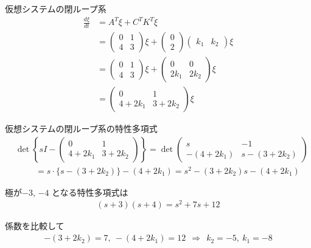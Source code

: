 仮想システムの閉ループ系
\begin{align*}
 \frac{d \xi}{dt} & = A^T \xi + C^T K^T \xi
\\
	&=
	\left (
	\begin{array}{cc}
	 0 & 1 \\
	 4 & 3
	\end{array}
	\right )
	\xi
	+
	\left (
	\begin{array}{c}
	 0 \\ 2 
	\end{array}
	\right )
	\left ( \begin{array}{cc}
		k_1 & k_2 
	\end{array} \right )
	\xi
\\
	&=
	\left (
	\begin{array}{cc}
	 0 & 1 \\
	 4 & 3
	\end{array}
	\right )
	\xi
	+
	\left (
	\begin{array}{cc}
	 0 & 0 \\ 2k_1 & 2k_2 
	\end{array}
	\right )
	\xi
\\
	&=
	\left (
	\begin{array}{cc}
	 0 & 1 \\
	 4 + 2k_1 & 3 + 2k_2
	\end{array}
	\right )
	\xi
\end{align*}

仮想システムの閉ループ系の特性多項式
\begin{align*}
	&\det
	\left \{
		sI- 
		\left ( 
		\begin{array}{cc}
		 0 & 1 \\
		 4 + 2k_1 & 3 + 2k_2
		\end{array}
		\right )
	\right \}
	=
	\det
	\left ( 
	\begin{array}{cc}
	 s & -1 \\
	 -(4 + 2k_1) & s-(3 + 2k_2)
	\end{array}
	\right )
\\
	& \hspace{1cm} =
	s \cdot \{ s-(3 + 2k_2) \} -(4 + 2k_1)
	=
	s^2 -(3 + 2k_2)s -(4 + 2k_1)
\end{align*}

極が$-3$, $-4$ となる特性多項式は
\begin{align*}
	(s+3)(s+4) = s^2+7s+12
\end{align*}

係数を比較して
\begin{align*}
	-(3 + 2k_2)=7, \ -(4 + 2k_1)=12 
	\ \ \Rightarrow \ \ 
	k_2=-5, \ k_1=-8
\end{align*}


